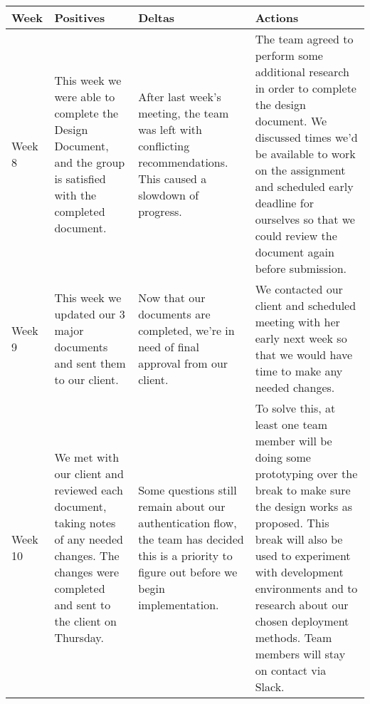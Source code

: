 \documentclass[onecolumn, draftclsnofoot,10pt, compsoc]{IEEEtran}
\begin{document}
\begin{tabular}{ p{} p{} p{} p{} }
    \textbf{Week} & \textbf{Positives} & \textbf{Deltas} & \textbf{Actions} \\ \hline
    Week 8
        & %
        This week we were able to complete the Design Document, and the group is satisfied with the completed document.
        & %
        After last week's meeting, the team was left with conflicting recommendations.
        This caused a slowdown of progress.
        & %
        The team agreed to perform some additional research in order to complete the design document.
        We discussed times we'd be available to work on the assignment and scheduled early deadline for ourselves so that we could review the document again before submission.
        \\ \hline
    Week 9
        & %
        This week we updated our 3 major documents and sent them to our client.
        & %
        Now that our documents are completed, we're in need of final approval from our client.
        & %
        We contacted our client and scheduled meeting with her early next week so that we would have time to make any needed changes.
        \\ \hline
    Week 10
        & %
        We met with our client and reviewed each document, taking notes of any needed changes. The changes were completed and sent to the client on Thursday.
        & %
        Some questions still remain about our authentication flow, the team has decided this is a priority to figure out before we begin implementation.
        & %
        To solve this, at least one team member will be doing some prototyping over the break to make sure the design works as proposed. This break will also be used to experiment with development environments and to research about our chosen deployment methods. Team members will stay on contact via Slack.
        \\ \hline
\end{tabular}


\clearpage

\clearpage
%
%
\end{document}
